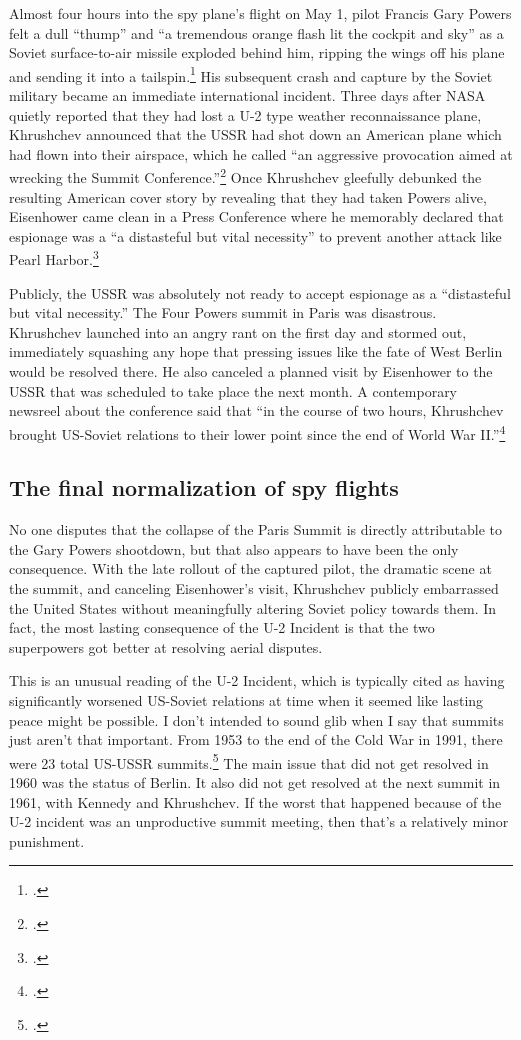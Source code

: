 \documentclass[12pt]{article}
\begin{document}
Almost four hours into the spy plane's flight on May 1, pilot Francis Gary Powers felt a dull ``thump'' and ``a tremendous orange flash lit the cockpit and sky'' as a Soviet surface-to-air missile exploded behind him, ripping the wings off his plane and sending it into a tailspin.\footcite[p.~61]{powers_operation_2004} His subsequent crash and capture by the Soviet military became an immediate international incident. Three days after NASA quietly reported that they had lost a U-2 type weather reconnaissance plane, Khrushchev announced that the USSR had shot down an American plane which had flown into their airspace, which he called ``an aggressive provocation aimed at wrecking the Summit Conference.''\footcite[p.~112]{powers_operation_2004} Once Khrushchev gleefully debunked the resulting American cover story by revealing that they had taken Powers alive, Eisenhower came clean in a Press Conference where he memorably declared that espionage was a ``a distasteful but vital necessity'' to prevent another attack like Pearl Harbor.\footcite{eisenhower_news_1960}

Publicly, the USSR was absolutely not ready to accept espionage as a ``distasteful but vital necessity.'' The Four Powers summit in Paris was disastrous. Khrushchev launched into an angry rant on the first day and stormed out, immediately squashing any hope that pressing issues like the fate of West Berlin would be resolved there. He also canceled a planned visit by Eisenhower to the USSR that was scheduled to take place the next month. A contemporary newsreel about the conference said that ``in the course of two hours, Khrushchev brought US-Soviet relations to their lower point since the end of World War II.''\footcite{universal_studios_summit_1960}

\subsection{The final normalization of spy flights}
No one disputes that the collapse of the Paris Summit is directly attributable to the Gary Powers shootdown, but that also appears to have been the only consequence. With the late rollout of the captured pilot, the dramatic scene at the summit, and canceling Eisenhower's visit, Khrushchev publicly embarrassed the United States without meaningfully altering Soviet policy towards them. In fact, the most lasting consequence of the U-2 Incident is that the two superpowers got better at resolving aerial disputes.

This is an unusual reading of the U-2 Incident, which is typically cited as having significantly worsened US-Soviet relations at time when it seemed like lasting peace might be possible. I don't intended to sound glib when I say that summits just aren't that important. From 1953 to the end of the Cold War in 1991, there were 23 total US-USSR summits.\footcite{fain_chronology_2011} The main issue that did not get resolved in 1960 was the status of Berlin. It also did not get resolved at the next summit in 1961, with Kennedy and Khrushchev. If the worst that happened because of the U-2 incident was an unproductive summit meeting, then that's a relatively minor punishment.
\end{document}

